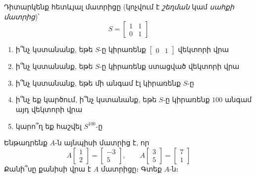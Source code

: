 \begin{problem}
Դիտարկենք հետևյալ մատրիցը (կոչվում է \textit{շեղման} կամ \textit{սահքի մատրից})՝
\[
S = \begin{bmatrix}
    1 & 1 \\ 0 & 1
\end{bmatrix}
\]
\begin{enumerate}[label={\alph*}․]
\item ի՞նչ կստանանք, եթե $S$-ը կիրառենք $\begin{bmatrix}
    0 & 1
\end{bmatrix}$ վեկտորի վրա

\item ի՞նչ կստանանք, եթե $S$-ը կիրառենք ստացված վեկտորի վրա

\item ի՞նչ կստանանք, եթե մի անգամ էլ կիրառենք $S$-ը

\item ի՞նչ եք կարծում, ի՞նչ կստանանք, եթե $S$-ը կիրառենք $100$ անգամ այդ վեկտորի վրա

\item կարո՞ղ եք հաշվել $S^{100}$-ը
\end{enumerate}
\end{problem}


\begin{problem}
Ենթադրենք $A$-ն այնպիսի մատրից է, որ
\[
A\begin{bmatrix}
    1 \\ 2
\end{bmatrix}
=
\begin{bmatrix}
    -3 \\ 5
\end{bmatrix},
\qquad 
A\begin{bmatrix}
    3 \\ 5
\end{bmatrix}
=
\begin{bmatrix}
    7 \\ 1
\end{bmatrix}
\]
Քանի՞սը քանիսի վրա է $A$ մատրիցը։ Գտեք $A$-ն։
\end{problem}










